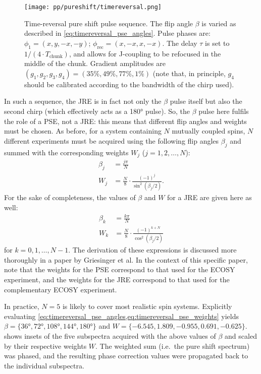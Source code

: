 \begin{figure}[htb]
    \centering
    \texttt{[image: pp/pureshift/timereversal.png]}
    \caption[Time-reversal pure shift pulse sequence]{
        Time-reversal pure shift pulse sequence.
        The flip angle $\beta$ is varied as described in \cref{eq:timereversal_pse_angles}.
        Pulse phases are: $\phi_1 = (x, y, -x, -y)$; $\phi_\text{rec} = (x, -x, x, -x)$.
        The delay $\tau$ is set to $1/(4 \cdot T_\text{chunk})$, and allows for J-coupling to be refocused in the middle of the chunk.
        Gradient amplitudes are $(g_1, g_2, g_3, g_4) = (35\%, 49\%, 77\%, 1\%)$ (note that, in principle, $g_4$ should be calibrated according to the bandwidth of the chirp used).
    }
    \label{fig:timereversal_pulseq}
\end{figure}

In such a sequence, the JRE is in fact not only the $\beta$ pulse itself but also the second chirp (which effectively acts as a \ang{180} pulse).
So, the $\beta$ pulse here fulfils the role of a PSE, not a JRE: this means that different flip angles and weights must be chosen.
As before, for a system containing $N$ mutually coupled spins, $N$ different experiments must be acquired using the following flip angles $\beta_j$ and summed with the corresponding weights $W_j$ ($j = 1, 2, \ldots, N$):
\begin{align}
    \beta_j &= \frac{j\pi}{N} \label{eq:timereversal_pse_angles} \\
    W_j &= \frac{N}{8}\cdot \frac{(-1)^j}{\sin^2(\beta_j/2)} \label{eq:timereversal_pse_weights}.
\end{align}
For the sake of completeness, the values of $\beta$ and $W$ for a JRE are given here as well:
\begin{align}
    \beta_k &= \frac{k\pi}{N} \label{eq:timereversal_jre_angles} \\
    W_k &= \frac{N}{8}\cdot \frac{(-1)^{k + N}}{\cos^2(\beta_j/2)} \label{eq:timereversal_jre_weights}
\end{align}
for $k = 0, 1, \ldots, N-1$.
The derivation of these expressions is discussed more thoroughly in a paper by Griesinger et al.\autocite{Griesinger1986JCP}
In the context of this specific paper, note that the weights for the PSE correspond to that used for the ECOSY experiment, and the weights for the JRE correspond to that used for the complementary ECOSY experiment.

In practice, $N = 5$ is likely to cover most realistic spin systems.
Explicitly evaluating \cref{eq:timereversal_pse_angles,eq:timereversal_pse_weights} yields $\beta = \{\ang{36}, \ang{72}, \ang{108}, \ang{144}, \ang{180}\}$ and $W = \{−6.545,1.809,−0.955,0.691,−0.625\}$.
 shows insets of the five subspectra acquired with the above values of $\beta$ and scaled by their respective weights $W$.
The weighted sum (i.e.\ the pure shift spectrum) was phased, and the resulting phase correction values were propagated back to the individual subspectra.

